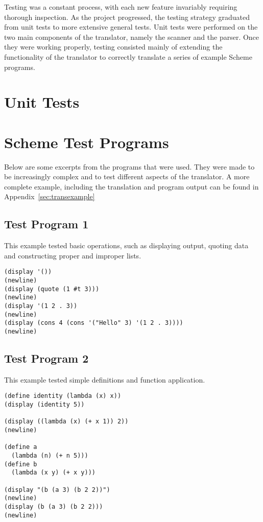 Testing was a constant process, with each new feature invariably requiring
thorough inspection. As the project progressed, the testing strategy graduated
from unit tests to more extensive general tests. Unit tests were performed on
the two main components of the translator, namely the scanner and the parser.
Once they were working properly, testing consisted mainly of extending the
functionality of the translator to correctly translate a series of example
Scheme programs.


\section{Unit Tests}


\section{Scheme Test Programs}

Below are some excerpts from the programs that were used. They were made to be
increasingly complex and to test different aspects of the translator. A more
complete example, including the translation and program output can be found in
Appendix~\ref{sec:transexample}

\subsection{Test Program 1}
This example tested basic operations, such as displaying output, quoting data
and constructing proper and improper lists.
\begin{framed}
\begin{verbatim}
(display '())
(newline)
(display (quote (1 #t 3)))
(newline)
(display '(1 2 . 3))
(newline)
(display (cons 4 (cons '("Hello" 3) '(1 2 . 3))))
(newline)
\end{verbatim}
\end{framed}

\subsection{Test Program 2}
This example tested simple definitions and function application.
\begin{framed}
\begin{verbatim}
(define identity (lambda (x) x))
(display (identity 5))

(display ((lambda (x) (+ x 1)) 2))
(newline)

(define a
  (lambda (n) (+ n 5)))
(define b
  (lambda (x y) (+ x y)))

(display "(b (a 3) (b 2 2))")
(newline)
(display (b (a 3) (b 2 2)))
(newline)
\end{verbatim}
\end{framed}

